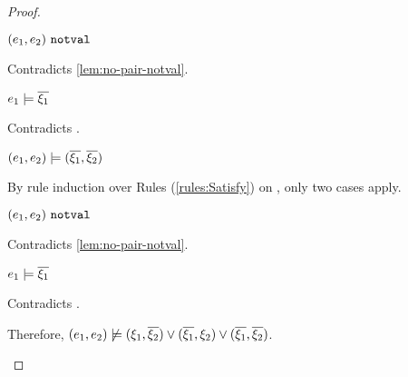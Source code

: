 \begin{proof}
\begin{byCases}
\begin{byCases}
\begin{byCases}
\begin{byCases}
\begin{byCases}
\begin{byCases}
\begin{pfsteps*}
                        \item $(e_1 , e_2) ~\mathtt{notval}$ 
                        \end{pfsteps*}
                        Contradicts \autoref{lem:no-pair-notval}.
                    \item[\text{(\ref{rule:CSPair})}]
                        \begin{pfsteps*}
                        \item $e_1 \models \overline{\xi_1}$ 
                        \end{pfsteps*}
                        Contradicts .
                    \end{byCases}
                \item[\text{(\ref{rule:CSOr2})}]
                    \begin{pfsteps*}
                    \item $(e_1 , e_2) \models (\overline{\xi_1} , \overline{\xi_2})$  
                    \end{pfsteps*}
                    By rule induction over Rules (\ref{rules:Satisfy}) on , only two cases apply.
                   \begin{byCases}
                    \item[\text{(\ref{rule:CSNotValPair})}]
                        \begin{pfsteps*}
                        \item $(e_1 , e_2) ~\mathtt{notval}$ 
                        \end{pfsteps*}
                        Contradicts \autoref{lem:no-pair-notval}.
                    \item[\text{(\ref{rule:CSPair})}]
                        \begin{pfsteps*}
                        \item $e_1 \models \overline{\xi_1}$ 
                        \end{pfsteps*}
                        Contradicts .
                    \end{byCases}
                \end{byCases}
            \end{byCases}
            Therefore, $(e_1 , e_2) \not\models (\xi_1 , \overline{\xi_2}) \vee (\overline{\xi_1} , \xi_2) \vee (\overline{\xi_1} , \overline{\xi_2})$.
           

\end{byCases}
\end{byCases}
\end{byCases}
\end{proof}
